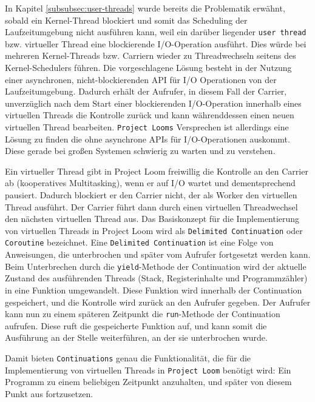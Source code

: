 In Kapitel \ref{subsubsec:user-threads} wurde bereits die Problematik erwähnt, sobald ein Kernel-Thread blockiert und somit
das Scheduling der Laufzeitumgebung nicht ausführen kann, weil ein darüber liegender \verb|user thread| bzw. virtueller Thread
eine blockierende I/O-Operation ausführt.
Dies würde bei mehreren Kernel-Threads bzw. Carriern wieder zu Threadwechseln seitens des Kernel-Schedulers führen.
Die vorgeschlagene Lösung besteht in der Nutzung einer asynchronen, nicht-blockierenden API für I/O Operationen von der Laufzeitumgebung.
 Dadurch erhält der Aufrufer, in diesem Fall der Carrier, unverzüglich nach dem Start einer blockierenden I/O-Operation
innerhalb eines virtuellen Threads die Kontrolle zurück und kann währenddessen einen neuen virtuellen Thread bearbeiten.\newline
\verb|Project Looms| Versprechen ist allerdings eine Lösung zu finden die ohne asynchrone APIs für I/O-Operationen auskommt.
Diese gerade bei großen Systemen schwierig zu warten und zu verstehen.\newline

Ein virtueller Thread gibt in Project Loom freiwillig die Kontrolle an den Carrier ab (kooperatives Multitasking), wenn er auf I/O wartet und
dementsprechend pausiert. Dadurch blockiert er den Carrier nicht, der als Worker den virtuellen Thread ausführt.
Der Carrier führt dann durch einen virtuellen Threadwechsel den nächsten virtuellen Thread aus.
Das Basiskonzept für die Implementierung von virtuellen Threads in Project Loom wird als \verb|Delimited Continuation| oder \verb|Coroutine| bezeichnet.\newline
Eine \verb|Delimited Continuation| ist eine Folge von Anweisungen, die unterbrochen und später vom Aufrufer fortgesetzt werden kann.
Beim Unterbrechen durch die \verb|yield|-Methode der Continuation wird der aktuelle Zustand des ausführenden Threads
(Stack, Registerinhalte und Programmzähler) in eine Funktion umgewandelt.
Diese Funktion wird innerhalb der Continuation gespeichert, und die Kontrolle wird zurück an den Aufrufer gegeben.
Der Aufrufer kann nun zu einem späteren Zeitpunkt die \verb|run|-Methode der Continuation aufrufen.
Diese ruft die gespeicherte Funktion auf, und kann somit die Ausführung an der Stelle weiterführen, an der sie unterbrochen wurde.

Damit bieten \verb|Continuations| genau die Funktionalität, die für die Implementierung von virtuellen Threads in \verb|Project Loom| benötigt wird:
Ein Programm zu einem beliebigen Zeitpunkt anzuhalten, und später von diesem Punkt aus fortzusetzen.

